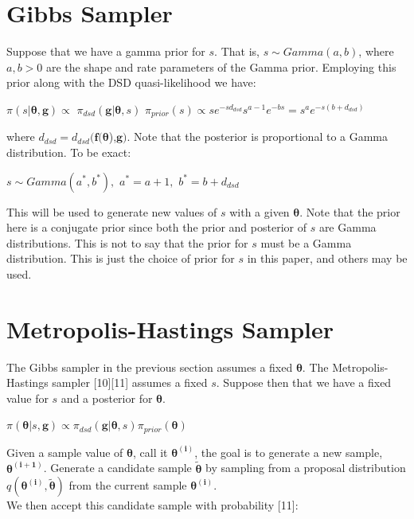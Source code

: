 \documentclass[botnum, fleqn]{unmeethesis}
\begin{document}
\section{\label{section:Gibbs Sampler}Gibbs Sampler}
Suppose that we have a gamma prior for $s$. That is, $s\sim Gamma(a,b)$, where $a,b>0$ are the shape and rate parameters of the Gamma prior. Employing this prior along with the DSD quasi-likelihood we have:
\begin{center}
	$\pi(s|\bm{\theta},\bm{g})\propto$ $\pi_{dsd}(\bm{g}|\bm{\theta},s)$ $\pi_{prior}(s)\propto se^{-sd_{dsd}}s^{a-1}e^{-bs}=s^{a}e^{-s(b+d_{dsd})}$
\end{center}
where $d_{dsd}=d_{dsd}(\bm{f}(\bm{\theta}$),$\bm{g})$. Note that the posterior is proportional to a Gamma distribution. To be exact:
\begin{center}
	$s\sim Gamma(a^*,b^*),$ \hspace{1cm} $a^*=a+1,$ \hspace{1cm}  $b^*=b+d_{dsd}$
\end{center}
This will be used to generate new values of $s$ with a given $\bm{\theta}$. Note that the prior here is a conjugate prior since both the prior and posterior of $s$ are Gamma distributions. This is not to say that the prior for $s$ must be a Gamma distribution. This is just the choice of prior for $s$ in this paper, and others may be used.
\section{\label{section:Metropolis-Hastings Sampler}Metropolis-Hastings Sampler}
The Gibbs sampler in the previous section assumes a fixed $\bm{\theta}$. The Metropolis-Hastings sampler [10][11] assumes a fixed $s$. Suppose then that we have a fixed value for $s$ and a posterior for $\bm{\theta}$.
\begin{center}
	$\pi(\bm{\theta}|s,\bm{g}) \propto \pi_{dsd}(\bm{g}|\bm{\theta},s)\pi_{prior}(\bm{\theta})$
\end{center}
Given a sample value of $\bm{\theta}$, call it $\bm{\theta^{(i)}}$, the goal is to generate a new sample, $\bm{\theta^{(i+1)}}$. Generate a candidate sample $\widetilde{\bm{\theta}}$ by sampling from a proposal distribution $q(\bm{\theta^{(i)}},\widetilde{\bm{\theta}})$ from the current sample $\bm{\theta^{(i)}}$.
\\ We then accept this candidate sample with probability [11]: \\
\end{document}
